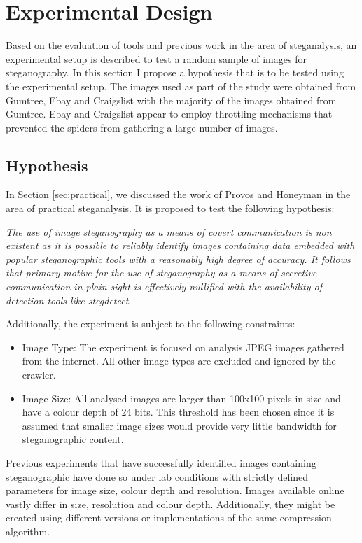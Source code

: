 \chapter{Experimental Design}
\label{ch:dev}
Based on the evaluation of tools and previous work in the area of
steganalysis, an experimental setup is described to test a random sample
of images for steganography. In this section I propose a hypothesis that
is to be tested using the experimental setup. The images used as part of
the study were obtained from Gumtree, Ebay and Craigslist with the
majority of the images obtained from Gumtree. Ebay and Craigslist appear
to employ throttling mechanisms that prevented the spiders from
gathering a large number of images.
\section{Hypothesis}
\label{sec:hypothesis}
In Section \ref{sec:practical}, we discussed the work of Provos and
Honeyman in the area of practical steganalysis. It is proposed to test
the following hypothesis:
\par
\emph{The use of image steganography as a means of covert communication
is non existent as it is possible to reliably identify images containing
data embedded with popular steganographic tools with a reasonably high
degree of accuracy. It follows that primary motive for the use of steganography as a
means of secretive communication in plain sight is effectively nullified
with the availability of detection tools like stegdetect}. 

Additionally, the experiment is subject to the following constraints:
\begin{itemize}
\item{Image Type}: The experiment is focused on analysis JPEG images
gathered from the internet. All other image types are excluded and
ignored by the crawler.
\item{Image Size}: All analysed images are larger than 100x100 pixels in
size and have a colour depth of 24 bits. This threshold has been chosen since it 
is assumed that smaller image sizes would provide very little bandwidth
for steganographic content.
\end{itemize}
\par  Previous experiments that have successfully identified images containing steganographic have done so under lab conditions with strictly defined parameters for image size, colour depth and resolution. Images available online vastly differ in size, resolution and colour depth. Additionally, they might be created using different versions or implementations of the same compression algorithm. 

